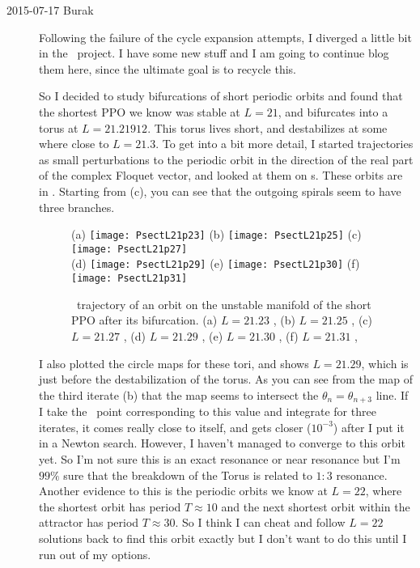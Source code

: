 \begin{description}
\item[2015-07-17 Burak] Following the failure of the cycle expansion attempts,
I diverged a little bit in the \KS\ project. I have some new stuff and I
am going to continue blog them here, since the ultimate goal is to recycle
this.

So I decided to study bifurcations of short periodic orbits and found that the
shortest PPO we know was stable at $L=21$, and bifurcates into a torus at
$L=21.21912$. This torus lives short, and destabilizes at some where close to
$L=21.3$. To get into a bit more detail, I started trajectories as small
perturbations to the periodic orbit in the direction of the real part of the
complex Floquet vector, and looked at them on \PoincSec s.
These orbits are in . Starting from  (c),
you can see that the outgoing spirals seem to have three branches.

\begin{figure}
\begin{center}
        (a) \texttt{[image: PsectL21p23]}
        (b) \texttt{[image: PsectL21p25]}
        (c) \texttt{[image: PsectL21p27]} \\
        (d) \texttt{[image: PsectL21p29]}
        (e) \texttt{[image: PsectL21p30]}
        (f) \texttt{[image: PsectL21p31]}
\end{center}
    \caption{
    \PoincSec\ trajectory of an orbit on the unstable
    manifold of the short PPO after its bifurcation.
    (a) $L = 21.23$ ,
    (b) $L = 21.25$ ,
    (c) $L = 21.27$ ,
    (d) $L = 21.29$ ,
    (e) $L = 21.30$ ,
    (f) $L = 21.31$ ,
    }
    \label{f-PsectL}
\end{figure}

I also plotted the circle maps for these tori, and  shows
$L=21.29$, which is just before the destabilization of the torus. As you can
see from the map of the third iterate  (b) that the map
seems to intersect the $\theta_n = \theta_{n+3}$ line. If I take the \statesp\
point corresponding to this value and integrate for three iterates, it comes
really close to itself, and gets closer ($10^{-3}$) after I put it in a Newton
search. However, I haven't managed to converge to this orbit yet. So I'm not
sure this is an exact resonance or near resonance but I'm $99\%$ sure that the
breakdown of the Torus is related to $1\!:\!3$ resonance. Another evidence to this
is the periodic orbits we know at $L=22$, where the shortest orbit has period
$T \approx 10$ and the next shortest orbit within the attractor has period
$T \approx 30$. So I think I can cheat and follow $L=22$ solutions back to find
this orbit exactly but I don't want to do this until I run out of my options.


\end{description}
